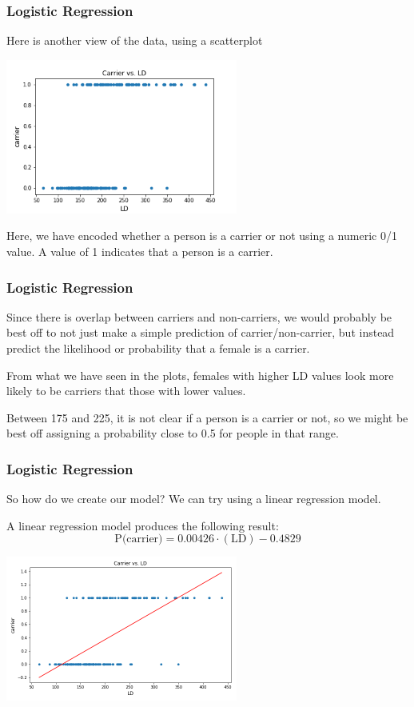 \documentclass[11pt, table]{beamer}
\newcommand{\p}{\pause}
\begin{document}
\begin{frame}
\frametitle{Logistic Regression}

Here is another view of the data, using a scatterplot

\begin{center}
	\includegraphics[width = 3in]{images/Dystrophy/scatter_01.png}
\end{center}

Here, we have encoded whether a person is a carrier or not using a numeric 0/1 value. A value of 1 indicates that a person is a carrier. 
\end{frame}


\begin{frame}
\frametitle{Logistic Regression}
Since there is overlap between carriers and non-carriers, we would probably be best off to not just make a simple prediction of carrier/non-carrier, but instead predict the likelihood or probability that a female is a carrier.
\vspace{0.1in}

From what we have seen in the plots, females with higher LD values look more likely to be carriers that those with lower values.
\vspace{0.1in}

 Between 175 and 225, it is not clear if a person is a carrier or not, so we might be best off assigning a probability close to 0.5 for people in that range.
\end{frame}

\begin{frame}
\frametitle{Logistic Regression}
So how do we create our model? We can try using a linear regression model.\p
\vspace{0.1in}

A linear regression model produces the following result:
$$\text{P(carrier)} = 0.00426\cdot(\text{LD}) - 0.4829$$

\begin{center}
	\includegraphics[width = 3in]{images/Dystrophy/scatter_02.png}
\end{center}
\end{frame}
\end{document}
